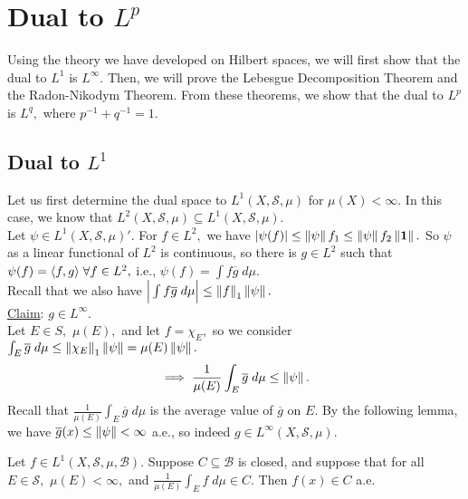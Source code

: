 \chapter{Dual to $L^p$}

Using the theory we have developed on Hilbert spaces, we will first show that the dual to $L^1$ is $L^{\infty}.$ Then, we will prove the Lebesgue Decomposition Theorem and the Radon-Nikodym Theorem. From these theorems, we show that the dual to $L^p$ is $L^q,$ where $p^{-1}+q^{-1}=1.$

\section{Dual to $L^1$}

\noindent Let us first determine the dual space to $L^1(X,\mathcal{S},\mu)$ for $\mu(X)<\infty.$ In this case, we know that $L^2(X,\mathcal{S},\mu)\subseteq L^1(X,\mathcal{S},\mu).$ \\
\noindent Let $\psi\in L^1(X,\mathcal{S},\mu)'.$ For $f\in L^2,$ we have $|\psi(f)|\leq\left\lVert\psi\right\rVert{f}_1\leq\left\lVert\psi\right\rVert{f}_2\left\lVert\mathbf{1}\right\rVert.$ So $\psi$ as a linear functional of $L^2$ is continuous, so there is $g\in L^2$ such that $\psi(f)=\langle f,g\rangle\;\forall f\in L^2,$ i.e., $\psi(f)=\int f\overline{g}\;d\mu.$ \\
\noindent Recall that we also have $\Big|\int f\overline{g}\;d\mu\Big|\leq\left\lVert f\right\rVert_1\left\lVert\psi\right\rVert.$ \\

\noindent\underline{Claim}: $g\in L^{\infty}.$ \\
\noindent Let $E\in S,$ $\mu(E),$ and let $f=\chi_E,$ so we consider $\int_E \overline{g}\;d\mu\leq\left\lVert\chi_E\right\rVert_1\left\lVert\psi\right\rVert=\mu(E)\left\lVert\psi\right\rVert.$
$$\implies\frac{1}{\mu(E)}\int_E\overline{g}\;d\mu\leq\left\lVert\psi\right\rVert.$$
Recall that $\frac{1}{\mu(E)}\int_E\overline{g}\;d\mu$ is the average value of $\overline{g}$ on $E.$ By the following lemma, we have $\overline{g}(x)\leq\left\lVert\psi\right\rVert<\infty$ a.e., so indeed $g\in L^{\infty}(X,\mathcal{S},\mu).$
\begin{lemma}
Let $f\in L^1(X,\mathcal{S},\mu, \mathcal{B}).$ Suppose $C\subseteq \mathcal{B}$ is closed, and suppose that for all $E\in\mathcal{S},$ $\mu(E)<\infty,$ and $\frac{1}{\mu(E)}\int_E f\;d\mu\in C.$ Then $f(x)\in C$ a.e. \\
\end{lemma}

